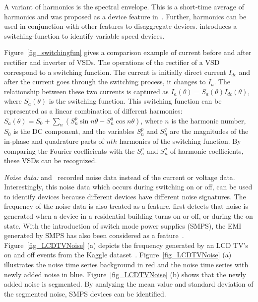 A variant of harmonics is the spectral envelope. 
This is a short-time average of harmonics 
and was proposed as a device feature in~\cite{leeb1995transient,laughman2003power}.
Further, harmonics can be used in conjunction with other features to disaggregate devices. 
\cite{wichakool2009modeling} introduces a switching-function 
to identify variable speed devices. 
\iffalse
\manishc{you use VSD in a lot of places,
  could you use the full expansion when it is used the first time, and then
  use VSD}\huijuanc{VSD has been explained in page 5. Is it necessary for us to list 
  all the abbreviations before the introduction section?}. 
\fi  

Figure~\ref{fig_switchingfun} gives a comparison example
of current before and after rectifier and inverter of VSDs.
The operations of the rectifier of a VSD correspond to
a switching function.
The current is initially direct current $I_{dc}$ and
after the current goes through the switching process,
it changes to $I_a$.
The relationship between these two currents
is captured as $I_a(\theta)=S_a(\theta)I_{dc}(\theta)$, 
where $S_a(\theta)$ is the switching function. 
This switching function can be represented as 
a linear combination of different harmonics: 
$S_a(\theta)=S_0+\sum_n(S_n^p \sin n\theta - S_n^q \cos n\theta)$, 
where $n$ is the harmonic number, $S_0$ is the DC component,
and the variables $S_n^p$ and $S_n^q$ are the magnitudes of
the in-phase and quadrature parts of $nth$ harmonics of the
switching function. 
By comparing the Fourier coefficients with the $S_n^p$ and $S_n^q$ of harmonic coefficients,
these VSDs can be recognized.

\textit{Noise data:}
\cite{patel2007flick} and~\cite{gupta2010electrisense} recorded 
noise data instead of the current or voltage data.
Interestingly, this noise data
which occurs during switching on or off, 
can be used to identify devices
because different devices have different noise signatures. 
The frequency of the noise data is also treated as a feature. 
\cite{patel2007flick} first detects that noise is generated 
when a device in a residential building
turns on or off, or during the on state. 
With the introduction of switch mode power supplies (SMPS), 
the EMI generated by SMPS has also been
considered
as a feature~\cite{gupta2010electrisense}.
Figure~\ref{fig_LCDTVNoise} (a) depicts
the frequency generated by an LCD TV's on and
off events from
the Kaggle dataset~\cite{kaggle2013energy}.
Figure~\ref{fig_LCDTVNoise} (a) illustrates the noise time series background in red and 
the noise time series with newly added noise in blue. 
Figure~\ref{fig_LCDTVNoise} (b) shows that the newly added noise is segmented. 
By analyzing the mean value and standard deviation of the segmented noise, 
SMPS devices can be identified. 
 

